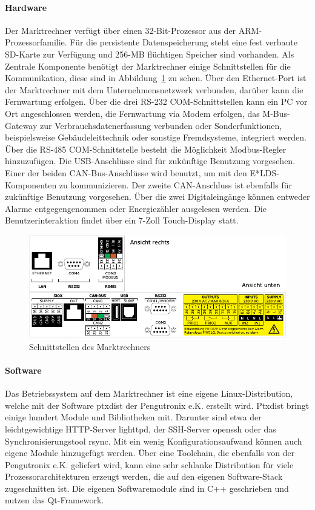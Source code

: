 \documentclass[11pt,a4paper]{report}
\begin{document}
\paragraph{Hardware} Der Marktrechner verfügt über einen 32-Bit-Prozessor aus der ARM-Prozessorfamilie. Für die persistente Datenspeicherung steht eine fest verbaute SD-Karte zur Verfügung und 256-MB flüchtigen Speicher sind vorhanden. Als Zentrale Komponente benötigt der Marktrechner einige Schnittstellen für die Kommunikation, diese sind in Abbildung~\ref{fig:marktrechner_interfaces} zu sehen. Über den Ethernet-Port ist der Marktrechner mit dem Unternehmensnetzwerk verbunden, darüber kann die Fernwartung erfolgen. Über die drei RS-232 COM-Schnittstellen kann ein PC vor Ort angeschlossen werden, die Fernwartung via Modem erfolgen, das M-Bus-Gateway zur Verbrauchsdatenerfassung verbunden oder Sonderfunktionen, beispielsweise Gebäudeleittechnik oder sonstige Fremdsysteme, integriert werden. Über die RS-485 COM-Schnittstelle besteht die Möglichkeit Modbus-Regler hinzuzufügen. Die USB-Anschlüsse sind für zukünftige Benutzung vorgesehen. Einer der beiden CAN-Bus-Anschlüsse wird benutzt, um mit den E*LDS-Komponenten zu kommunizieren. Der zweite CAN-Anschluss ist ebenfalls für zukünftige Benutzung vorgesehen. Über die zwei Digitaleingänge können entweder Alarme entgegengenommen oder Energiezähler ausgelesen werden. Die Benutzerinteraktion findet über ein 7-Zoll Touch-Display statt.

\begin{figure}[htbp]
\centering
\includegraphics[scale=1.1]{images/CI4000_Hardware_Sticker.pdf}
\caption{Schnittstellen des Marktrechners}
\label{fig:marktrechner_interfaces}
\end{figure}

\paragraph{Software} \label{sec:g_ptxdist}

Das Betriebssystem auf dem Marktrechner ist eine eigene Linux-Distribu\-tion, welche mit der Software ptxdist der Pengutronix e.K. erstellt wird. Ptxdist bringt einige hundert Module und Bibliotheken mit. Darunter sind etwa der leichtgewichtige HTTP-Server lighttpd, der SSH-Server openssh oder das Synchronisierungstool rsync. Mit ein wenig Konfigurationsaufwand können auch eigene Module hinzugefügt werden. Über eine Toolchain, die ebenfalls von der Pengutronix e.K. geliefert wird, kann eine sehr schlanke Distribution für viele Prozessorarchitekturen erzeugt werden, die auf den eigenen Software-Stack zugeschnitten ist. Die eigenen Softwaremodule sind in C++ geschrieben und nutzen das Qt-Framework. 
\end{document}

